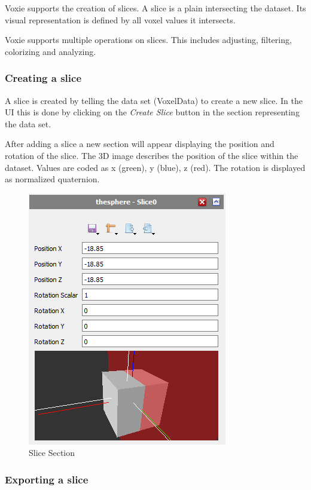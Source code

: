 Voxie supports the creation of slices. A slice is a plain intersecting the dataset. 
Its visual representation is defined by all voxel values it intersects.

Voxie supports multiple operations on slices. This includes adjusting, filtering, colorizing and analyzing.

\subsubsection{Creating a slice}

A slice is created by telling the data set (VoxelData) to create a new slice. In the UI this is done by clicking on the \textit{Create Slice} button in the section representing the data set.

After adding a slice a new section will appear displaying the position and rotation of the slice. The 3D image describes the position of the slice within the dataset. Values are coded as x (green),  y (blue), z (red). The rotation is displayed as normalized quaternion.

\begin{figure}[h]
  \centering
  \includegraphics[scale=1.0]{img/2d/3dslice.png}
  \caption{Slice Section}
\end{figure}

\subsubsection{Exporting a slice}

